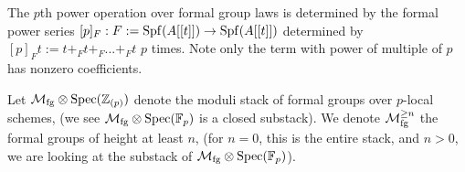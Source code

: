 \begin{remark}
    The $p$th power operation over formal group laws is determined by the formal power series $[p]_F: F:=\operatorname{\mathrm{Spf}}(A[[t]])\to \operatorname{\mathrm{Spf}}(A[[t]])$ determined by $[p]_Ft:=t+_Ft+_F...+_Ft$ $p$ times.
    Note only the term with power of multiple of $p$ has nonzero coefficients.
\end{remark}

\begin{definition}
    Let $\mathcal{M}_{\mathrm{fg}}\otimes \operatorname{\mathrm{Spec}}(\mathbb{Z}_{(p)})$ denote the moduli stack of formal groups over $p$-local schemes, (we see $\mathcal{M}_{\mathrm{fg}}\otimes \operatorname{\mathrm{Spec}}(\mathbb{F}_p)$ is a closed substack). We denote $\mathcal{M}_{\mathrm{fg}}^{\geq n}$ the formal groups of height at least $n$, (for $n=0$, this is the entire stack, and $n>0$, we are looking at the substack of $\mathcal{M}_{\mathrm{fg}}\otimes \operatorname{\mathrm{Spec}}(\mathbb{F}_p)$).
\end{definition}

